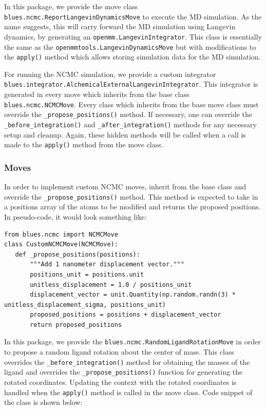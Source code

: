 In this package, we provide the move class \texttt{blues.ncmc.ReportLangevinDynamicsMove} to execute the MD simulation.
As the name suggests, this will carry forward the MD simulation using Langevin dynamics, by generating an \texttt{openmm.LangevinIntegrator}.
This class is essentially the same as the \texttt{openmmtools.LangevinDynamicsMove} but with modifications to the \texttt{apply()} method which allows storing simulation data for the MD simulation.

For running the NCMC simulation, we provide a custom integrator \texttt{blues.integrator.AlchemicalExternalLangevinIntegrator}. 
This integrator is generated in every move which inherits from the base class \texttt{blues.ncmc.NCMCMove}.
Every class which inherits from the base move class must override the \texttt{_propose_positions()} method.
If necessary, one can override the \texttt{_before_integration()} and \texttt{_after_integration()} methods for any necessary setup and cleanup.
Again, these hidden methods will be called when a call is made to the \texttt{apply()} method from the move class.

\subsubsection{Moves}
In order to implement custom NCMC moves, inherit from the base class and override the \texttt{_propose_positions()} method. 
This method is expected to take in a positions array of the atoms to be modified and returns the proposed positions.
In pseudo-code, it would look something like:

\begin{verbatim}
from blues.ncmc import NCMCMove
class CustomNCMCMove(NCMCMove):
   def _propose_positions(positions):
       """Add 1 nanometer displacement vector."""
       positions_unit = positions.unit
       unitless_displacement = 1.0 / positions_unit
       displacement_vector = unit.Quantity(np.random.randn(3) * unitless_displacement_sigma, positions_unit)
       proposed_positions = positions + displacement_vector
       return proposed_positions
\end{verbatim}

In this package, we provide the \texttt{blues.ncmc.RandomLigandRotationMove} in order to propose a random ligand rotation about the center of mass.
This class overrides the \texttt{_before_integration()} method for obtaining the masses of the ligand and overrides the \texttt{_propose_positions()} function for generating the rotated coordinates. Updating the context with the rotated coordinates is handled when the \texttt{apply()} method is called in the move class. 
Code snippet of the class is shown below:

